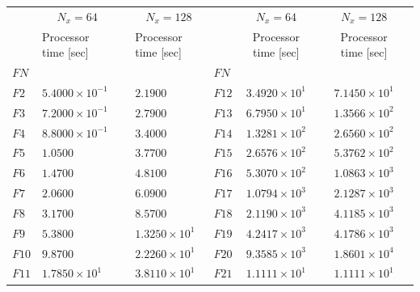\documentclass[11pt,titlepage]{report}
\newcommand{\ra}[1]{\renewcommand{\arraystretch}{#1}}
\begin{document}
\begin{table}\centering
\ra{1.4}
\begin{tabular}{@{}llcllclcl@{}}\toprule[2 pt]
&\multicolumn{1}{c}{$N_x = 64$} & \phantom{abc} & \multicolumn{1}{c}{$N_x = 128$} & \phantom{abc} & \multicolumn{1}{c}{$N_x = 64$} & \phantom{abc} & \multicolumn{1}{c}{$N_x = 128$} &\\
\cmidrule{2-2}  \cmidrule{4-4} \cmidrule{6-6} \cmidrule{8-8}
& Processor time [sec] && Processor time [sec] && Processor time [sec] && Processor time [sec] \\
\midrule
\phantom{a}$FN$ & && & \phantom{a}$FN$ \\
\phantom{a}$F2$	&	$5.4000\times 10^{-1}$	&&	$2.1900\phantom{\times 10^{-2}}$	&	\phantom{a}$F12$		 & 	$3.4920\times 10^{1}$	 && 	$7.1450\times 10^{1}$		\\
\phantom{a}$F3$	&	$7.2000\times 10^{-1}$	&&	$2.7900\phantom{\times 10^{-2}}$	&	\phantom{a}$F13$		 & 	$6.7950\times 10^{1}$	 && 	$1.3566\times 10^{2}$		\\
\phantom{a}$F4$	&	$8.8000\times 10^{-1}$	&&	$3.4000\phantom{\times 10^{-3}}$	&	\phantom{a}$F14$		 & 	$1.3281\times 10^{2}$	 && 	$2.6560\times 10^{2}$		\\
\phantom{a}$F5$	&	$1.0500\phantom{\times 10^{-2}}$	&&	$3.7700\phantom{\times 10^{-3}}$	&	\phantom{a}$F15$		 & 	$2.6576\times 10^{2}$	 && 	$5.3762\times 10^{2}$		\\
\phantom{a}$F6$	&	$1.4700\phantom{\times 10^{-2}}$	&&	$4.8100\phantom{\times 10^{-4}}$	&	\phantom{a}$F16$		 & 	$5.3070\times 10^{2}$	 && 	$1.0863\times 10^{3}$		\\
\phantom{a}$F7$	&	$2.0600\phantom{\times 10^{-2}}$	&&	$6.0900\phantom{\times 10^{-4}}$	&	\phantom{a}$F17$		 & 	$1.0794\times 10^{3}$	 && 	$2.1287\times 10^{3}$		\\
\phantom{a}$F8$	&	$3.1700\phantom{\times 10^{-2}}$	&&	$8.5700\phantom{\times 10^{-5}}$	&	\phantom{a}$F18$		 & 	$2.1190\times 10^{3}$	 && 	$4.1185\times 10^{3}$		\\
\phantom{a}$F9$	&	$5.3800\phantom{\times 10^{-2}}$	&&	$1.3250\times 10^{1}$	&	\phantom{a}$F19$		 & 	$4.2417\times 10^{3}$	 && 	$4.1786\times 10^{3}$		\\
\phantom{a}$F10$	&	$9.8700\phantom{\times 10^{-2}}$	&&	$2.2260\times 10^{1}$	&	\phantom{a}$F20$		 & 	$9.3585\times 10^{3}$	 && 	$1.8601\times 10^{4}$		\\
\phantom{a}$F11$	&	$1.7850\times 10^{1}$	&&	$3.8110\times 10^{1}$	&	\phantom{a}$F21$		 & 	$1.1111\times 10^{1}$	 && 	$1.1111\times 10^{1}$		\\

\end{tabular}
\end{table}
\end{document}
